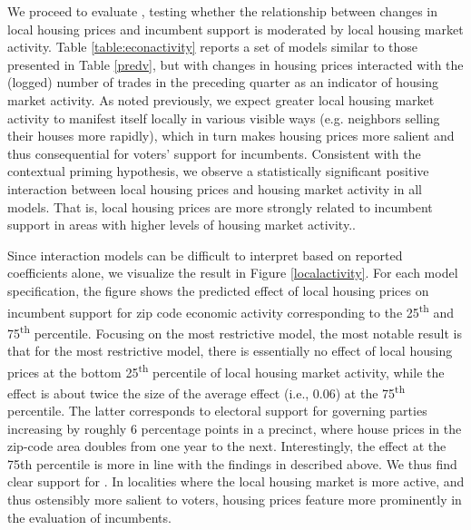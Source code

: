 \documentclass[12pt,a4paper]{article}
\begin{document}
	We proceed to evaluate \htwo, testing whether the relationship between changes in local housing prices and incumbent support is moderated by local housing market activity. Table \ref{table:econactivity} reports a set of models similar to those presented in Table \ref{predv}, but with changes in housing prices interacted with the (logged) number of trades in the preceding quarter as an indicator of housing market activity. As noted previously, we expect greater local housing market activity to manifest itself locally in various visible ways (e.g. neighbors selling their houses more rapidly), which in turn makes housing prices more salient and thus consequential for voters’ support for incumbents. Consistent with the contextual priming hypothesis, we observe a statistically significant positive interaction between local housing prices and housing market activity in all models. That is, local housing prices are more strongly related to incumbent support in areas with higher levels of housing market activity..
	
	
	
	Since interaction models can be difficult to interpret based on reported coefficients alone, we visualize the result in Figure \ref{localactivity}. For each model specification, the figure shows the predicted effect of local housing prices on incumbent support for zip code economic activity corresponding to the 25\textsuperscript{th} and 75\textsuperscript{th} percentile. Focusing on the most restrictive model, the most notable result is that for the most restrictive model, there is essentially no effect of local housing prices at the bottom 25\textsuperscript{th} percentile of local housing market activity, while the effect is about twice the size of the average effect  (i.e., 0.06) at the 75\textsuperscript{th} percentile. The latter corresponds to electoral support for governing parties increasing by roughly 6 percentage points in a precinct, where house prices in the zip-code area doubles from one year to the next. Interestingly, the effect at the 75th percentile is more in line with the findings in \citep{healy2017presidential}described above. We thus find clear support for \htwo. In localities where the local housing market is more active, and thus ostensibly more salient to voters, housing prices feature more prominently in the evaluation of incumbents. 
	
\end{document}
